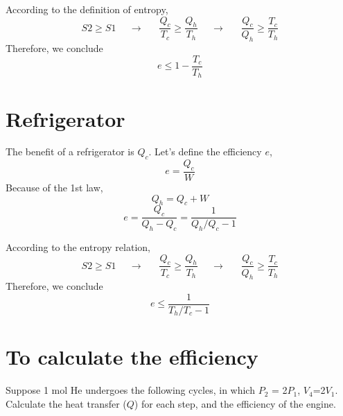 According to the definition of entropy,
\begin{equation}    S2 \geq S1              ~~~~~~\rightarrow~~~~~~~ 
       \frac{Q_c}{T_c} \geq \frac{Q_h}{T_h} ~~~~~~\rightarrow~~~~~~~
       \frac{Q_c}{Q_h} \geq \frac{T_c}{T_h} 
\end{equation}
Therefore, we conclude
\begin{equation} e \leq 1-\frac{T_c}{T_h} \end{equation}


\section{Refrigerator}
The benefit of a refrigerator is $Q_c$. Let's define the efficiency $e$,
\begin{equation} e = \frac{Q_c}{W} \end{equation}
Because of the 1st law,
\begin{equation} Q_h = Q_c + W \end{equation}
\begin{equation} e = \frac{Q_c}{Q_h-Q_c} = \frac{1}{Q_h/Q_c-1} \end{equation}

According to the entropy relation,
\begin{equation}    S2 \geq S1              ~~~~~~\rightarrow~~~~~~~ 
       \frac{Q_c}{T_c} \geq \frac{Q_h}{T_h} ~~~~~~\rightarrow~~~~~~~
       \frac{Q_c}{Q_h} \geq \frac{T_c}{T_h} 
\end{equation}
Therefore, we conclude
\begin{equation} e \leq \frac{1}{T_h/T_c-1} \end{equation}

\section{To calculate the efficiency}
Suppose 1 mol He undergoes the following cycles, in which $P_2$ = 2$P_1$, $V_4$=2$V_1$. Calculate 
the heat transfer ($Q$) for each step, and the efficiency of the engine.\\



